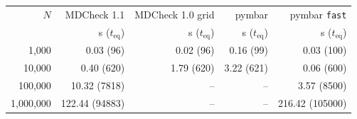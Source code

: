 \begin{tabular}{rrrrr}
\toprule
$N$ & MDCheck 1.1 & MDCheck 1.0 grid & pymbar & pymbar \texttt{fast} \\
 & s ($t_{\mathrm{eq}}$) & s ($t_{\mathrm{eq}}$) & s ($t_{\mathrm{eq}}$) & s ($t_{\mathrm{eq}}$) \\
\midrule
1,000 & 0.03 (96) & 0.02 (96) & 0.16 (99) & 0.03 (100) \\
10,000 & 0.40 (620) & 1.79 (620) & 3.22 (621) & 0.06 (600) \\
100,000 & 10.32 (7818) & -- & -- & 3.57 (8500) \\
1,000,000 & 122.44 (94883) & -- & -- & 216.42 (105000) \\
\bottomrule
\end{tabular}
